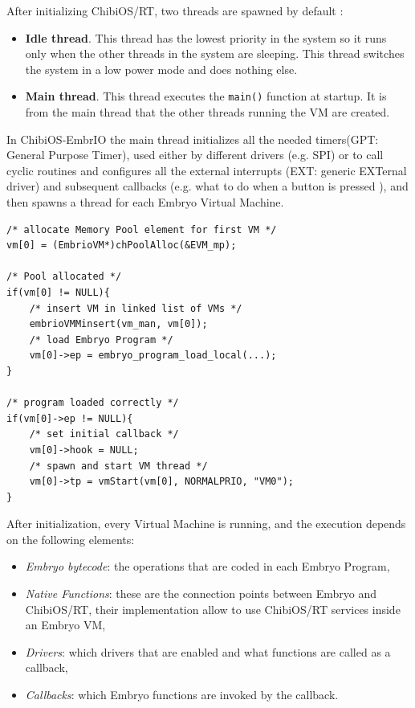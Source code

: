\documentclass[a4paper,10pt]{article}
\begin{document}
\begin{multicols}{2}
After initializing ChibiOS/RT, two threads are spawned by default \cite{chThd}:
\begin{itemize}
\item \textbf{Idle thread}. This thread has the lowest priority in the system so it runs only when the other threads in the system are sleeping. This thread switches the system in a low power mode and does nothing else.
\item \textbf{Main thread}. This thread executes the \texttt{main()} function at startup. It is from the main thread that the other threads running the VM are created.
\end{itemize}

In ChibiOS-EmbrIO the main thread initializes all the needed timers(GPT: General Purpose Timer), used either by different drivers (e.g. SPI) or to call cyclic routines and configures all the external interrupts (EXT: generic EXTernal driver) and subsequent callbacks (e.g. what to do when a button is pressed ), and then spawns a thread for each Embryo Virtual Machine.
\bigskip
\begin{lstlisting}[caption={EmbrIO VM start}]
/* allocate Memory Pool element for first VM */
vm[0] = (EmbrioVM*)chPoolAlloc(&EVM_mp);

/* Pool allocated */
if(vm[0] != NULL){
	/* insert VM in linked list of VMs */
	embrioVMMinsert(vm_man, vm[0]);
	/* load Embryo Program */
	vm[0]->ep = embryo_program_load_local(...);
}

/* program loaded correctly */
if(vm[0]->ep != NULL){
	/* set initial callback */
	vm[0]->hook = NULL;
	/* spawn and start VM thread */
	vm[0]->tp = vmStart(vm[0], NORMALPRIO, "VM0");
}
\end{lstlisting}
\bigskip
After initialization, every Virtual Machine is running, and the execution depends on the following elements:
\begin{itemize}
\item \textit{Embryo bytecode}: the operations that are coded in each Embryo Program,
\item \textit{Native Functions}: these are the connection points between Embryo and ChibiOS/RT, their implementation allow to use ChibiOS/RT services inside an Embryo VM,
\item \textit{Drivers}: which drivers that are enabled and what functions are called as a callback,
\item \textit{Callbacks}: which Embryo functions are invoked by the callback.
\end{itemize}


\end{multicols}
\end{document}
